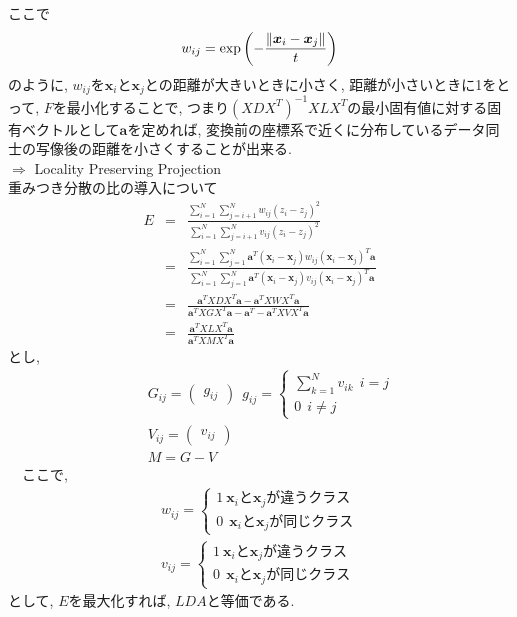 \documentclass[dvipdfmx,a4j]{jsarticle}
\begin{document}
  ここで
  \begin{eqnarray*}
    w_{ij}={\rm exp}\left(-\frac{\|\bm{x}_{i}-\bm{x}_{j}\|}{t}\right)
  \end{eqnarray*}
  のように, $w_{ij}$を$\bm{x}_{i}$と$\bm{x}_{j}$との距離が大きいときに小さく, 距離が小さいときに1をとって, $F$を最小化することで, つまり$(XDX^{T})^{-1}XLX^{T}$の最小固有値に対する固有ベクトルとして$\bm{a}$を定めれば, 変換前の座標系で近くに分布しているデータ同士の写像後の距離を小さくすることが出来る.\\
  $\Rightarrow$ Locality Preserving Projection\\[1cm]
  重みつき分散の比の導入について
  \begin{eqnarray*}
    E&=&\frac{\displaystyle \sum_{i=1}^{N}\sum_{j=i+1}^{N}w_{ij}(z_{i}-z_{j})^{2}}{\displaystyle \sum_{i=1}^{N}\sum_{j=i+1}^{N}v_{ij}(z_{i}-z_{j})^{2}}\\
     &=&\frac{\displaystyle \sum_{i=1}^{N}\sum_{j=1}^{N}\bm{a}^{T}(\bm{x}_{i}-\bm{x}_{j})w_{ij}(\bm{x}_{i}-\bm{x}_{j})^{T}\bm{a}}{\displaystyle \sum_{i=1}^{N}\sum_{j=1}^{N}\bm{a}^{T}(\bm{x}_{i}-\bm{x}_{j})v_{ij}(\bm{x}_{i}-\bm{x}_{j})^{T}\bm{a}}\\
     &=&\frac{\bm{a}^{T}XDX^{T}\bm{a}-\bm{a}^{T}XWX^{T}\bm{a}}{\bm{a}^{T}XGX^{T}\bm{a}-\bm{a}^{T}-\bm{a}^{T}XVX^{T}\bm{a}}\\
     &=&\frac{\bm{a}^{T}XLX^{T}\bm{a}}{\bm{a}^{T}XMX^{T}\bm{a}}
  \end{eqnarray*}
  とし,
  \begin{eqnarray*}
    &&G_{ij}=\begin{pmatrix}g_{ij}\end{pmatrix}\ \ g_{ij}=\left\{ \begin{array}{l} \displaystyle \sum_{k=1}^{N}v_{ik}\ \ i=j\\ 0\ \ i\neq j \end{array} \right.\\
    &&V_{ij}=\begin{pmatrix}v_{ij}\end{pmatrix}\\
    &&M=G-V
  \end{eqnarray*}
  　ここで,
  \begin{eqnarray*}
    w_{ij}=\left\{ \begin{array}{l} 1 \ \bm{x}_{i}と\bm{x}_{j}が違うクラス\\ 0\ \ \bm{x}_{i}と\bm{x}_{j}が同じクラス\end{array} \right.\\
    v_{ij}=\left\{ \begin{array}{l} 1 \ \bm{x}_{i}と\bm{x}_{j}が違うクラス\\ 0\ \ \bm{x}_{i}と\bm{x}_{j}が同じクラス\end{array} \right.   
  \end{eqnarray*}
  として, $E$を最大化すれば, $LDA$と等価である.
\end{document}
